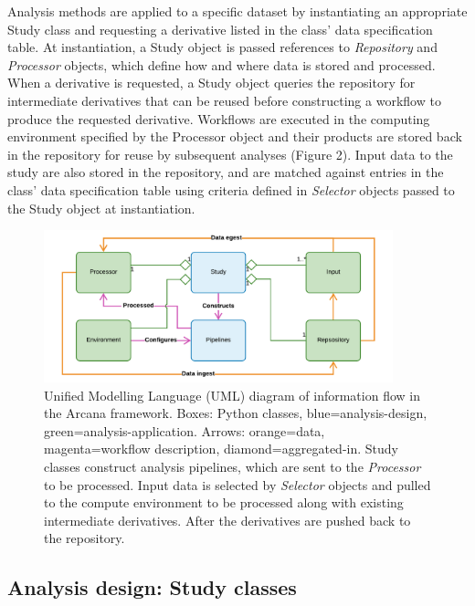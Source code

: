 Analysis methods are applied to a specific dataset by instantiating an
appropriate Study class and requesting a derivative listed in the class'
data specification table. At instantiation, a Study object is passed
references to \emph{Repository} and \emph{Processor} objects, which
define how and where data is stored and processed. When a derivative is
requested, a Study object queries the repository for intermediate
derivatives that can be reused before constructing a workflow to produce
the requested derivative. Workflows are executed in the computing
environment specified by the Processor object and their products are
stored back in the repository for reuse by subsequent analyses (Figure
2). Input data to the study are also stored in the repository, and are
matched against entries in the class' data specification table using
criteria defined in \emph{Selector} objects passed to the Study object
at instantiation.

\begin{figure}
  \begin{center}
    \includegraphics[width=0.9\textwidth]{figures/simplified_arcana_uml}
  \caption{Unified Modelling Language (UML) diagram
of information flow in the Arcana framework. Boxes: Python classes,
blue=analysis-design, green=analysis-application. Arrows: orange=data,
magenta=workflow description, diamond=aggregated-in. Study classes
construct analysis pipelines, which are sent to the \emph{Processor} to
be processed. Input data is selected by \emph{Selector} objects and
pulled to the compute environment to be processed along with existing
intermediate derivatives. After the derivatives are pushed back to the
repository.}
\end{center}
\label{fig:simple_uml}
\end{figure}

\subsection{Analysis design: Study classes}
\label{analysis-design-study-classes}

